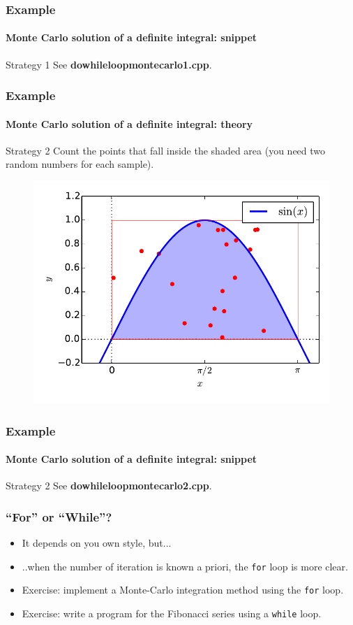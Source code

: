\documentclass[12pt]{beamer}
\begin{document}
\begin{frame}
  \frametitle{Example}
  \framesubtitle{Monte Carlo solution of a definite  integral: snippet}
    Strategy 1
    \LstDoWhileMontecarloOne
    See \textbf{dowhileloopmontecarlo1.cpp}.
\end{frame}



\begin{frame}
  \frametitle{Example}
  \framesubtitle{Monte Carlo solution of a definite  integral: theory}
\begin{block}{Strategy 2}
Count the points that fall inside the shaded area (you need two random numbers for each sample).
\end{block}
  \begin{figure}
    \includegraphics[height=0.7\textheight]{../figures/montecarlo}
  \end{figure}
\end{frame}


\begin{frame}
  \frametitle{Example}
  \framesubtitle{Monte Carlo solution of a definite  integral: snippet}
    Strategy 2
    \LstDoWhileMontecarloTwo
    See \textbf{dowhileloopmontecarlo2.cpp}.
\end{frame}




\begin{frame}
\frametitle{``For'' or ``While''?}
	\begin{itemize}
		\item It depends on you own style, but...
		\item ..when the number of iteration is known a priori, the \lstinline/for/ loop is more clear.
		\item Exercise: implement a Monte-Carlo integration method using the \lstinline/for/ loop.
		\item Exercise: write a program for the Fibonacci series using  a \lstinline/while/ loop.
	\end{itemize}
\end{frame}
\end{document}
